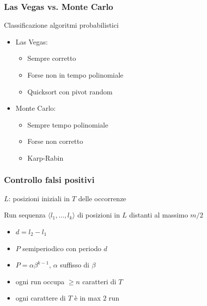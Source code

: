 \begin{frame}[fragile]
\frametitle{Las Vegas vs.
  Monte Carlo}
\begin{block}{Classificazione algoritmi probabilistici}
\begin{itemize}
\item
Las Vegas:
\begin{itemize}
\item
Sempre corretto
\item
Forse non in tempo polinomiale
\item
Quicksort con pivot random
\end{itemize}
\item
Monte Carlo:
\begin{itemize}
\item
Sempre tempo polinomiale
\item
Forse non corretto
\item
Karp-Rabin
\end{itemize}
\end{itemize}
\end{block}
\end{frame}


\begin{frame}[fragile]
\frametitle{Controllo falsi positivi}
$L$: posizioni iniziali in $T$ delle occorrenze
\begin{block}{Run}
sequenza $\langle l_{1}, \ldots, l_{k}\rangle$ di posizioni in $L$ distanti al
massimo $m/2$
\end{block}

\begin{itemize}
\item
$d=l_{2}-l_{1}$
\item
$P$ semiperiodico con periodo $d$
\item
$P=\alpha\beta^{k-1}$, $\alpha$ suffisso di $\beta$
\item
ogni run occupa $\ge n$ caratteri di $T$
\item
ogni carattere  di $T$ è in max $2$ run
\end{itemize}
\end{frame}


